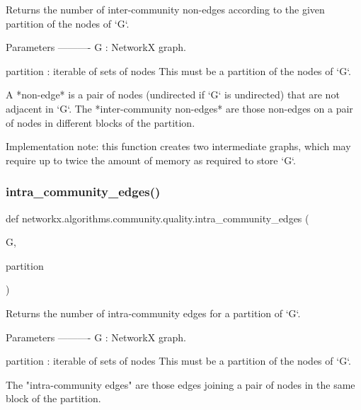 \begin{DoxyVerb}Returns the number of inter-community non-edges according to the
given partition of the nodes of `G`.

Parameters
----------
G : NetworkX graph.

partition : iterable of sets of nodes
    This must be a partition of the nodes of `G`.

A *non-edge* is a pair of nodes (undirected if `G` is undirected)
that are not adjacent in `G`. The *inter-community non-edges* are
those non-edges on a pair of nodes in different blocks of the
partition.

Implementation note: this function creates two intermediate graphs,
which may require up to twice the amount of memory as required to
store `G`.\end{DoxyVerb}
 \mbox{\label{namespacenetworkx_1_1algorithms_1_1community_1_1quality_a48ccd23eb0eba240ec55b00f6d7b5006}} 
\subsubsection{\texorpdfstring{intra\+\_\+community\+\_\+edges()}{intra\_community\_edges()}}
{\footnotesize\ttfamily def networkx.\+algorithms.\+community.\+quality.\+intra\+\_\+community\+\_\+edges (\begin{DoxyParamCaption}\item[{}]{G,  }\item[{}]{partition }\end{DoxyParamCaption})}

\begin{DoxyVerb}Returns the number of intra-community edges for a partition of `G`.

Parameters
----------
G : NetworkX graph.

partition : iterable of sets of nodes
    This must be a partition of the nodes of `G`.

The "intra-community edges" are those edges joining a pair of nodes
in the same block of the partition.\end{DoxyVerb}
 \mbox{\label{namespacenetworkx_1_1algorithms_1_1community_1_1quality_ab4499bce41b3784f8a4fab8bffc17adc}} 
